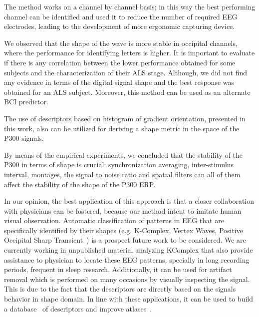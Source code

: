 \documentclass[utf8]{frontiersSCNS} %
\begin{document}
The method works on a channel by channel basis; in this way the best performing channel can be identified and used it to reduce the number of required EEG electrodes, leading to the development of more ergonomic capturing device.

We observed that the shape of the wave is more stable in occipital channels, where the performance for identifying letters is higher.   %
It is important to evaluate if there is any correlation between the lower performance obtained for some subjects and the characterization of their ALS stage.  Although,  we did not find any evidence in terms of the digital signal shape and the best response was obtained for an ALS subject.  Moreover, this method can be used as an alternate BCI predictor.  

The use of descriptors based on  histogram of gradient orientation, presented in this work, also can be utilized for deriving a shape metric in the space of the P300 signals.


By means of the empirical experiments, we concluded that the stability of the P300 in terms of shape is crucial: synchronization averaging,  inter-stimulus interval,  montages, the signal to noise ratio and spatial filters can all of them affect the stability of the shape of the P300 ERP. 


In our opinion, the best application of this approach is that a closer collaboration with physicians can be fostered, because our method intent to imitate human visual observation.
Automatic classification of patterns in EEG that are specifically identified by their shapes (e.g. K-Complex, Vertex Waves, Positive Occipital Sharp Transient~\citep{Hartman2005}) is a prospect future work to be considered. We are currently working in unpublished material analyzing KComplex that also provide  assistance to physician to locate these EEG patterns, specially in long recording periods, frequent in sleep research.  
Additionally, it can be used for artifact removal which is performed on many occasions by visually inspecting the signal.  This is due to the fact that the descriptors are directly based on the signals behavior in shape domain.  In line with these applications,  it can be used to build a database~\citep{Chavarriaga2017} of descriptors and improve atlases~\citep{Hartman2005}.
\end{document}
